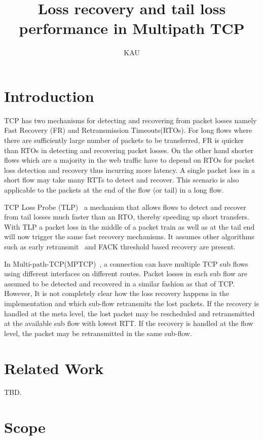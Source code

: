 \documentclass[10pt,draftcls,twocolumn]{IEEEconf}
\title{Loss recovery and tail loss performance in Multipath TCP}
\author{KAU}
\begin{document}
\maketitle

\begin{abstract}
\end{abstract}

\section{Introduction}
TCP has two mechanisms for detecting and recovering from packet losses namely Fast Recovery (FR) and Retransmission Timeouts(RTOs). For long flows where there are sufficiently large number of packets 
to be transferred, FR is quicker than RTOs in detecting and recovering packet losses. On the other hand shorter flows which are a majority in the web traffic have to depend on RTOs for packet loss detection 
and recovery thus incurring more latency. A single packet loss in a short flow may take many RTTs to detect and recover. This scenario is also applicable to the packets at the end of the flow (or tail) in a long 
flow.

TCP Loss Probe (TLP)~\cite{ietftlp} a mechanism that allows flows to detect and recover from tail losses much faster than an RTO, thereby speeding up short transfers. With TLP a packet loss in the middle 
of a packet train as well as at the tail end will now trigger the same fast recovery mechanisms. It assumes other algorithms such as early retransmit~\cite{rfc5827} and FACK threshold based recovery are 
present.

In Multi-path-TCP(MPTCP)~\cite{rfc6824}, a connection can have multiple TCP sub flows using different interfaces on different routes. Packet losses in each sub flow are assumed to be detected and recovered 
in a similar fashion as that of TCP. However, It is not completely clear how the loss recovery happens in the implementation and which sub-flow retransmits the lost packets. If the recovery is handled at the 
meta level, the lost packet may be rescheduled and retransmitted at the available sub flow with lowest RTT. If the recovery is handled at the flow level, the packet may be retransmitted in the same sub-flow. 




\section{Related Work}\label{relwork}
TBD.
\section{Scope}\label{scope}
\end{document}
